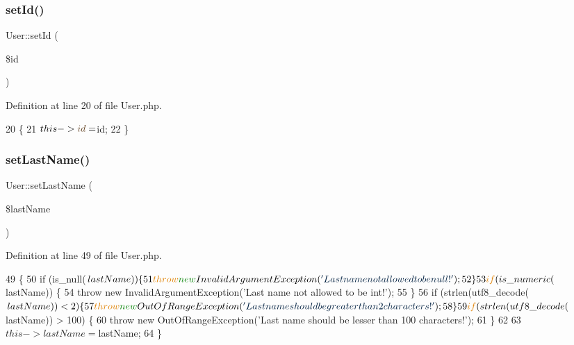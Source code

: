\subsubsection{\texorpdfstring{set\+Id()}{setId()}}
{\footnotesize\ttfamily User\+::set\+Id (\begin{DoxyParamCaption}\item[{}]{\$id }\end{DoxyParamCaption})}



Definition at line 20 of file User.\+php.


\begin{DoxyCode}
20                               \{
21         $this->\textcolor{keywordtype}{id} = $id;
22     \}
\end{DoxyCode}
\hypertarget{class_user_acbe8bdd002179a3bc115ec7a9afb7e0b}{}\label{class_user_acbe8bdd002179a3bc115ec7a9afb7e0b} 
\subsubsection{\texorpdfstring{set\+Last\+Name()}{setLastName()}}
{\footnotesize\ttfamily User\+::set\+Last\+Name (\begin{DoxyParamCaption}\item[{}]{\$last\+Name }\end{DoxyParamCaption})}



Definition at line 49 of file User.\+php.


\begin{DoxyCode}
49                                           \{
50         \textcolor{keywordflow}{if} (is\_null($lastName)) \{
51             \textcolor{keywordflow}{throw} \textcolor{keyword}{new} InvalidArgumentException(\textcolor{stringliteral}{'Last name not allowed to be null!'});
52         \}
53         \textcolor{keywordflow}{if} (is\_numeric($lastName)) \{
54             \textcolor{keywordflow}{throw} \textcolor{keyword}{new} InvalidArgumentException(\textcolor{stringliteral}{'Last name not allowed to be int!'});
55         \}
56         \textcolor{keywordflow}{if} (strlen(utf8\_decode($lastName)) < 2) \{
57             \textcolor{keywordflow}{throw} \textcolor{keyword}{new} OutOfRangeException(\textcolor{stringliteral}{'Last name should be greater than 2 characters!'});
58         \}
59         \textcolor{keywordflow}{if} (strlen(utf8\_decode($lastName)) > 100) \{
60             \textcolor{keywordflow}{throw} \textcolor{keyword}{new} OutOfRangeException(\textcolor{stringliteral}{'Last name should be lesser than 100 characters!'});
61         \}
62 
63         $this->lastName = $lastName;
64     \}
\end{DoxyCode}
\hypertarget{class_user_a81a82307eef393fb41f0b3b76375472c}{}\label{class_user_a81a82307eef393fb41f0b3b76375472c} 
